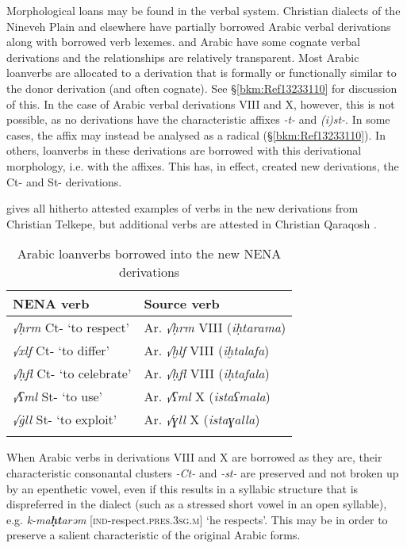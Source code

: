 \documentclass[output=paper]{langsci/langscibook}
\begin{document}
Morphological loans may be found in the verbal system. Christian  dialects of the Nineveh Plain and elsewhere have partially borrowed Arabic verbal derivations along with borrowed verb lexemes.  and Arabic have some {cognate} verbal derivations and the relationships are relatively transparent. Most Arabic loanverbs are allocated to a  {derivation} that is formally or functionally similar to the donor {derivation} (and often {cognate}). See §\ref{bkm:Ref13233110} for discussion of this. In the case of Arabic verbal derivations VIII and X, however, this is not possible, as no  derivations have the characteristic affixes \textit{{}-t-} and \textit{(i)st-}. In some cases, the affix may instead be analysed as a radical (§\ref{bkm:Ref13233110}). In others, loanverbs in these derivations are borrowed with this {derivational} morphology, i.e. with the affixes. This has, in effect, created new derivations, the Ct- and St- derivations.

 gives all hitherto attested examples of verbs in the new derivations from Christian Telkepe, but additional verbs are attested in Christian Qaraqosh \citep[130]{Khan2002}.

\begin{table}
\caption{Arabic loanverbs borrowed into the new NENA derivations\label{tab:coghill:1}}
\begin{tabular}{ll}
\lsptoprule
NENA verb & Source verb\\\midrule
{\textit{√ḥrm} Ct- ‘to respect’} & {Ar. \textit{√ḥrm} VIII (\textit{iḥtarama})}\\
\textit{√xlf} Ct- ‘to differ’ & {Ar. \textit{√ḫlf} VIII (\textit{iḫtalafa})}\\
{\textit{√ḥfl} Ct- ‘to celebrate’} & {Ar. \textit{√ḥfl} VIII (\textit{iḥtafala})}\\
{\textit{√ʕml} St- ‘to use’} & {Ar. \textit{√ʕml} X (\textit{istaʕmala})}\\
\textit{√\.gll} St- ‘to exploit’ & {Ar. \textit{√ɣll} X (\textit{istaɣalla})}\\
\lspbottomrule
\end{tabular}
\end{table}

When Arabic verbs in derivations VIII and X are borrowed as they are, their characteristic consonantal clusters \textit{{}-Ct-} and \textit{{}-st-} are preserved and not broken up by an epenthetic vowel, even if this results in a {syllabic structure} that is dispreferred in the  dialect (such as a stressed short vowel in an open syllable), e.g. \textit{k-ma}\kern -0.5pt\textbf{\textit{ḥt}}\kern -1pt\textit{arəm} [\textsc{ind}\nobreakdash-respect.\textsc{pres.}3\textsc{sg.m}] ‘he respects’. This may be in order to preserve a salient characteristic of the original Arabic forms.
\end{document}
